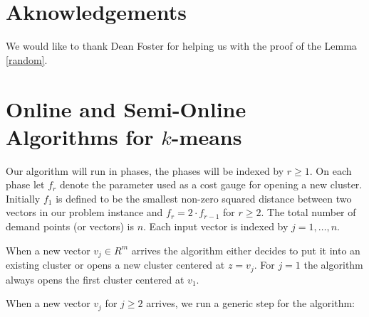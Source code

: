 \documentclass[11pt,twoside]{article}
\begin{document}
\section{Aknowledgements}
We would like to thank  Dean Foster for  helping us with the proof of the Lemma \ref{random}.








\appendix




\section{Online and Semi-Online Algorithms for $k$-means}\label{alg}

Our algorithm will run in phases, the phases will be indexed by $r\ge 1$. On each phase  let $f_r$ denote the parameter used as a cost gauge for opening a new cluster. Initially $f_1$ is defined to be the smallest non-zero squared distance between two vectors in our problem instance and $f_r=2\cdot f_{r-1}$ for $r\ge 2$.
The total number of demand points (or vectors) is $n$.  Each input vector is indexed by  $j=1,\dots,n$. 

When a new vector $v_j\in R^m$ arrives the algorithm either decides to put it into an existing cluster or opens a new cluster centered at $z=v_j$. For $j=1$ the algorithm always opens the first cluster centered at $v_1$.

When a new vector $v_j$ for $j\ge 2$ arrives, we run a generic step for the algorithm:
\end{document}
